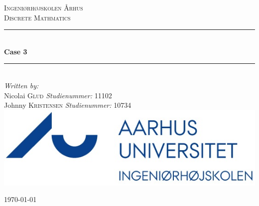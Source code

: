 \newcommand{\HRule}{\rule{\linewidth}{0.5mm}} %

\begin{center} %
 

\textsc{\LARGE Ingeniørhøjskolen Århus}\\[1.5cm] %
\textsc{\large Discrete Mathmatics}\\[0.5cm] %


\HRule \\[0.4cm]
{ \huge \bfseries Case 3}\\[0.4cm] %
\HRule \\[1.5cm]
 

\Large \emph{Written by:}\\
Nicolai \textsc{Glud} \textit{Studienummer:} 11102\\
Johnny \textsc{Kristensen} \textit{Studienummer:} 10734\\



\includegraphics[scale=2]{billeder/iha-logo}\\ %
 

\vfill %

{\large \today}\\[3cm] %
\end{center}
